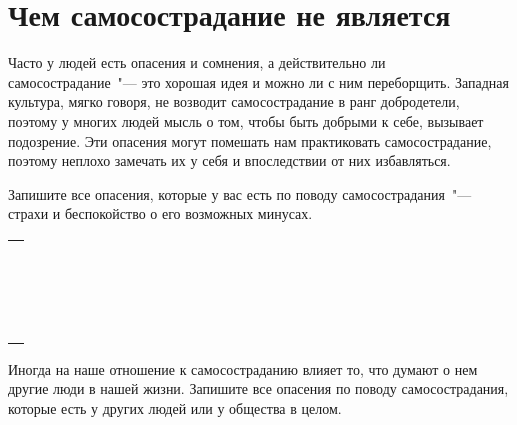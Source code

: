
\chapter{Чем самосострадание не является} \label{What_Self-Compassion_Is_Not}

Часто у людей есть опасения и сомнения, а действительно ли самосострадание~"--- это хорошая идея и можно ли с ним переборщить. Западная культура, мягко говоря, не возводит самосострадание в ранг добродетели, поэтому у многих людей мысль о том, чтобы быть добрыми к себе, вызывает подозрение. Эти опасения могут помешать нам практиковать самосострадание, поэтому неплохо замечать их у себя и впоследствии от них избавляться.

\newpage


Запишите все опасения, которые у вас есть по поводу самосострадания~"--- страхи и беспокойство о его возможных минусах.

\setlength{\extrarowheight}{2mm}
\begin{tabularx}{\textwidth}{X}
	\\
	\arrayrulecolor{gray}\hline\\
	\hline\\
	\hline\\
	\hline\\
	\hline\\
	\hline\\
	\hline\\
	\hline\\
	\hline\\
	\hline\\
	\hline\\
	\hline\\
	\hline\\
	\hline\\
	\hline\\
	\hline\\
	\hline\\
	\hline\\	
\end{tabularx}
\setlength{\extrarowheight}{0mm}

Иногда на наше отношение к самосостраданию влияет то, что думают о нем другие люди в нашей жизни. Запишите все опасения по поводу самосострадания, которые есть у других людей или у общества в целом.


